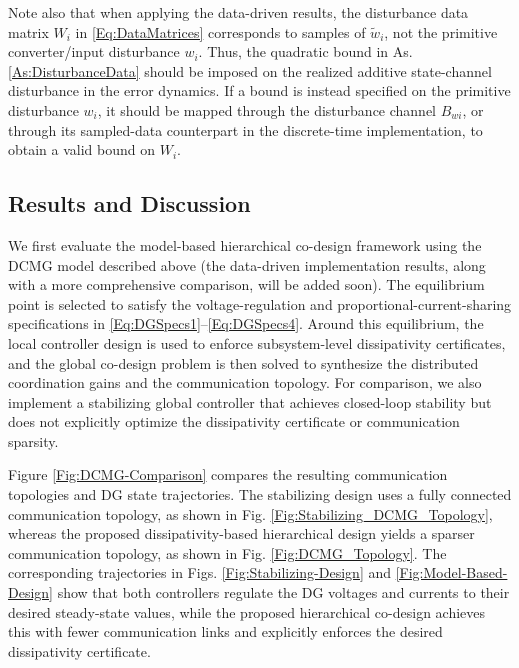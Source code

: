 \documentclass[letterpaper, 10 pt, conference]{ieeeconf}%
\newcommand{\0}{\mathbf{0}}
\begin{document}
Note also that when applying the data-driven results, the disturbance data matrix $W_i$ in \eqref{Eq:DataMatrices} corresponds to samples of $\tilde{w}_i$, not the primitive converter/input disturbance $w_i$. Thus, the quadratic bound in As. \ref{As:DisturbanceData} should be imposed on the realized additive state-channel disturbance in the error dynamics. If a bound is instead specified on the primitive disturbance $w_i$, it should be mapped through the disturbance channel $B_{wi}$, or through its sampled-data counterpart in the discrete-time implementation, to obtain a valid bound on $W_i$.

\subsection{Results and Discussion}
We first evaluate the model-based hierarchical co-design framework using the DCMG model described above (the data-driven implementation results, along with a more comprehensive comparison, will be added soon). The equilibrium point is selected to satisfy the voltage-regulation and proportional-current-sharing specifications in \eqref{Eq:DGSpecs1}--\eqref{Eq:DGSpecs4}. Around this equilibrium, the local controller design is used to enforce subsystem-level dissipativity certificates, and the global co-design problem is then solved to synthesize the distributed coordination gains and the communication topology. For comparison, we also implement a stabilizing global controller that achieves closed-loop stability but does not explicitly optimize the dissipativity certificate or communication sparsity.

Figure \ref{Fig:DCMG-Comparison} compares the resulting communication topologies and DG state trajectories. The stabilizing design uses a fully connected communication topology, as shown in Fig. \ref{Fig:Stabilizing_DCMG_Topology}, whereas the proposed dissipativity-based hierarchical design yields a sparser communication topology, as shown in Fig. \ref{Fig:DCMG_Topology}. The corresponding trajectories in Figs. \ref{Fig:Stabilizing-Design} and \ref{Fig:Model-Based-Design} show that both controllers regulate the DG voltages and currents to their desired steady-state values, while the proposed hierarchical co-design achieves this with fewer communication links and explicitly enforces the desired dissipativity certificate. 
\end{document}

